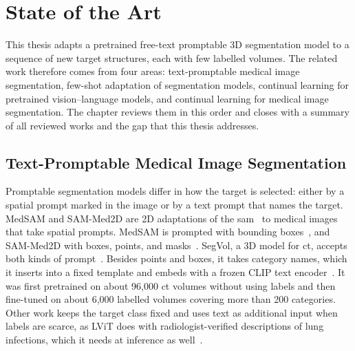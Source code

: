 %
%

\chapter{State of the Art}
\label{chap:sota}

This thesis adapts a pretrained free-text promptable 3D segmentation model to a sequence of new target structures, each with few labelled volumes.
The related work therefore comes from four areas: text-promptable medical image segmentation, few-shot adaptation of segmentation models, continual learning for pretrained vision--language models, and continual learning for medical image segmentation.
The chapter reviews them in this order and closes with a summary of all reviewed works and the gap that this thesis addresses.

\section{Text-Promptable Medical Image Segmentation}
\label{sec:text-promptable-seg}

Promptable segmentation models differ in how the target is selected: either by a spatial prompt marked in the image or by a text prompt that names the target.
MedSAM and SAM-Med2D are 2D adaptations of the \gls{sam}~\cite{Kirillov_2023_ICCV} to medical images that take spatial prompts.
MedSAM is prompted with bounding boxes~\cite{Ma_2024}, and SAM-Med2D with boxes, points, and masks~\cite{cheng2023sammed2d}.
SegVol, a 3D model for \gls{ct}, accepts both kinds of prompt~\cite{du2025segvoluniversalinteractivevolumetric}.
Besides points and boxes, it takes category names, which it inserts into a fixed template and embeds with a frozen CLIP text encoder~\cite{radford2021learningtransferablevisualmodels}.
It was first pretrained on about 96{,}000 \gls{ct} volumes without using labels and then fine-tuned on about 6{,}000 labelled volumes covering more than 200 categories.
Other work keeps the target class fixed and uses text as additional input when labels are scarce, as LViT does with radiologist-verified descriptions of lung infections, which it needs at inference as well~\cite{li2023lvitlanguagemeetsvision}.

